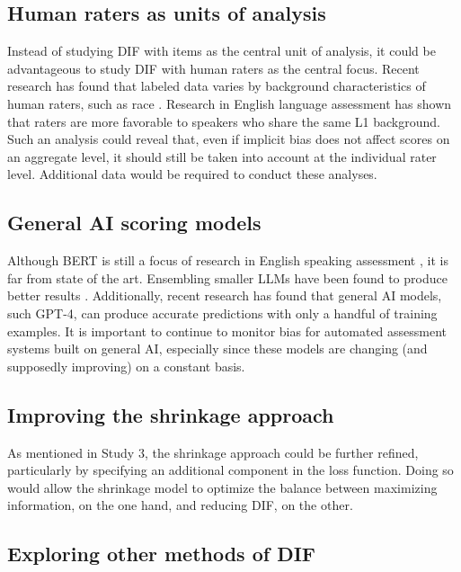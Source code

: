 \documentclass [PhD] {uclathes}
\begin{document}
\subsection{Human raters as units of analysis}

Instead of studying DIF with items as the central unit of analysis, it could be advantageous to study DIF with human raters as the central focus. Recent research has found that labeled data varies by background characteristics of human raters, such as race \citep{prabhakaran2021releasing}. Research in English language assessment has shown that raters are more favorable to speakers who share the same L1 background. Such an analysis could reveal that, even if implicit bias does not affect scores on an aggregate level, it should still be taken into account at the individual rater level. Additional data would be required to conduct these analyses. 

\subsection{General AI scoring models}

Although BERT is still a focus of research in English speaking assessment \citep[e.g.][]{wang2021automated}, it is far from state of the art. Ensembling smaller LLMs have been found to produce better results \citep{ormerod2021automated}. Additionally, recent research has found that general AI models, such GPT-4, can produce accurate predictions with only a handful of training examples. It is important to continue to monitor bias for automated assessment systems built on general AI, especially since these models are changing (and supposedly improving) on a constant basis.  

\subsection{Improving the shrinkage approach}

As mentioned in Study 3, the shrinkage approach could be further refined, particularly by specifying an additional component in the loss function. Doing so would allow the shrinkage model to optimize the balance between maximizing information, on the one hand, and reducing DIF, on the other.

\subsection{Exploring other methods of DIF}
\end{document}
